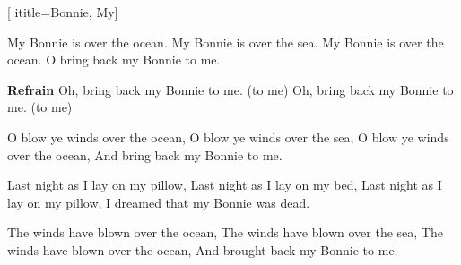 [
  ititle={Bonnie, My}]

  
\beginverse
My Bonnie is over the ocean.
My Bonnie is over the sea.
My Bonnie is over the ocean.
O bring back my Bonnie to me.
\endverse

\beginchorus
\textbf{Refrain}
Oh, bring back my Bonnie to me. (to me)
Oh, bring back my Bonnie to me. (to me)
\endchorus

\beginverse
O blow ye winds over the ocean,
O blow ye winds over the sea,
O blow ye winds over the ocean,
And bring back my Bonnie to me.
\endverse

\beginverse
Last night as I lay on my pillow,
Last night as I lay on my bed,
Last night as I lay on my pillow,
I dreamed that my Bonnie was dead.
\endverse

\beginverse
The winds have blown over the ocean,
The winds have blown over the sea,
The winds have blown over the ocean,
And brought back my Bonnie to me.
\endverse

\endsong
